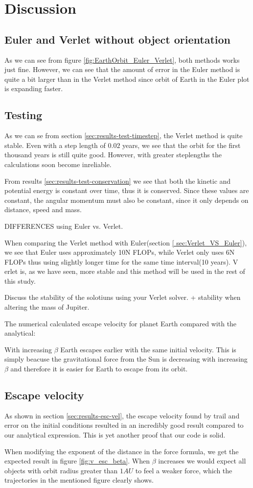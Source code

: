 \documentclass[../main.tex]{subfiles}
\begin{document}
\section{Discussion}\label{sec:discussion}

\subsection{Euler and Verlet without object orientation}
As we can see from figure \ref{fig:EarthOrbit_Euler_Verlet}, both methods works just fine. However, we can see that the amount of error in the Euler method is quite a bit larger than in the Verlet method since orbit of Earth in the Euler plot is expanding faster.

\subsection{Testing}
As we can se from section \ref{sec:results-test-timestep}, the Verlet method is quite stable. Even with a step length of $0.02$ years, we see that the orbit for the first thousand years is still quite good. However, with greater steplengths the calculations soon become inreliable.

From results \ref{sec:results-test-conservation} we see that both the kinetic and potential energy is constant over time, thus it is conserved. Since these values are constant, the angular momentum must also be constant, since it only depends on distance, speed and mass.

DIFFERENCES using Euler vs. Verlet.

When comparing the Verlet method with Euler(section \ref{ sec:Verlet_VS_Euler}), we see that Euler uses approximately 10N FLOPs, while Verlet only uses 6N FLOPs thus using slightly longer time for the same time interval(10 years).
V
erlet is, as we have seen, more stable and this method will be used in the rest of this study.

Discuss the stability of the solotiuns using your Verlet solver.  + stability when altering the mass of Jupiter.

The numerical calculated escape velocity for planet Earth compared with the analytical:

With increasing $\beta$ Earth escapes earlier with the same initial velocity. This is simply beacuse the gravitational force from the Sun is decreasing with increasing $\beta$ and therefore it is easier for Earth to escape from its orbit.

\subsection{Escape velocity}
As shown in section \ref{sec:results-esc-vel}, the escape velocity found by trail and error on the initial conditions resulted in an incredibly good result compared to our analytical expression. This is yet another proof that our code is solid.

When modifying the exponent of the distance in the force formula, we get the expected result in figure \ref{fig:v_esc_beta}. When $\beta$ increases we would expect all objects with orbit radius greater than $1AU$ to feel a weaker force, which the trajectories in the mentioned figure clearly shows.
\end{document}
